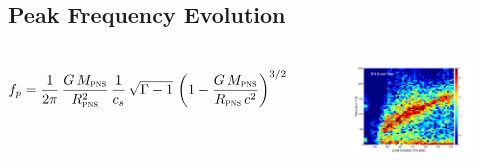 \documentclass[aspectratio=169]{beamer}
\begin{document}
\subsection{Peak Frequency Evolution}

\begin{frame}

  \begin{columns}[c]

      \begin{equation*}
      f_{p}=\frac{1}{2\pi}\,\frac{G\,M_{\textsc{pns}}}{R_{\textsc{pns}}^{2}}\,\frac{1}{c_{s}}
      \,\sqrt{\Gamma-1}\,\left(1-\frac{G\,M_{\textsc{pns}}}{R_{\textsc{pns}}\,c^{2}}\right)^{3/2}
      \end{equation*}

      \begin{figure}
        \includegraphics[width=1.0\textwidth]{Figures/D15_spectrogram_TOTAL.pdf}
      \end{figure}

  \end{columns}

\end{frame}
\end{document}
